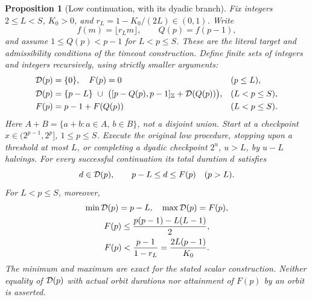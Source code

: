 \documentclass[11pt]{article}
\newtheorem{proposition}{Proposition}
\theoremstyle{remark}\newtheorem{remark}[proposition]{Remark}
\begin{document}
\begin{proposition}[Low continuation, with its dyadic branch]
\label{prop:shaik-low-schedule}
Fix integers \(2\le L<S\), \(K_0>0\), and
\(r_L=1-K_0/(2L)\in(0,1)\). Write
\[
 f(m)=\lfloor r_Lm\rfloor,\qquad Q(p)=f(p-1),
\]
and assume \(1\le Q(p)<p-1\) for \(L<p\le S\).
These are the literal target and admissibility conditions of the
timeout construction. Define finite sets of integers and integers
recursively, using strictly smaller arguments:
\begin{align}
 {\cal D}(p)&=\{0\},\quad F(p)=0 &&(p\le L), \notag\\
 {\cal D}(p)&=\{p-L\}\ \cup\
       \bigl([p-Q(p),p-1]_{\mathbb Z}+{\cal D}(Q(p))\bigr),
       &&(L<p\le S), \label{eq:shaik-low-duration-set}\\
 F(p)&=p-1+F(Q(p)) &&(L<p\le S). \notag
\end{align}
Here \(A+B=\{a+b:a\in A,\ b\in B\}\), not a disjoint union.
Start at a checkpoint \(x\in(2^{p-1},2^p]\), \(1\le p\le S\). Execute the original
low procedure, stopping upon a threshold at most \(L\), or completing
a dyadic checkpoint \(2^u\), \(u>L\), by \(u-L\) halvings.
For every successful continuation its total duration \(d\) satisfies
\[
 d\in{\cal D}(p),\qquad p-L\le d\le F(p)\quad(p>L).
\]
For \(L<p\le S\), moreover,
\begin{equation}\label{eq:shaik-low-budget}
 \begin{gathered}
 \min{\cal D}(p)=p-L,\quad\max{\cal D}(p)=F(p),\\
 F(p)\le\frac{p(p-1)-L(L-1)}2,\\
 F(p)<\frac{p-1}{1-r_L}=\frac{2L(p-1)}{K_0}.
 \end{gathered}
\end{equation}
The minimum and maximum are exact for the stated scalar construction.
Neither equality of \({\cal D}(p)\) with actual orbit durations nor
attainment of \(F(p)\) by an orbit is asserted.
\end{proposition}
\end{document}
